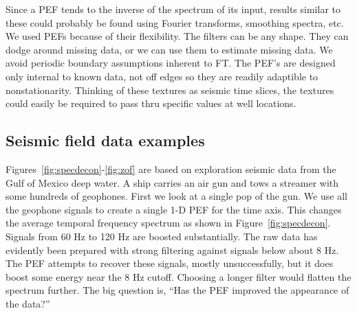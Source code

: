 



\par
Since a PEF tends to the inverse of the spectrum of its input,
results similar to these could probably be found
using Fourier transforms, smoothing spectra, etc.
We used PEFs because of their flexibility.
The filters can be any shape.
They can dodge around missing data, or we can use them
to estimate missing data.
We avoid periodic boundary assumptions inherent to FT.
The PEF's are designed only internal to known data, not off edges
so they are readily adaptible to nonstationarity.
Thinking of these textures as seismic time slices,
the textures could easily be required to pass thru specific
values at well locations.  



\subsection{Seismic field data examples}
\par
Figures~\ref{fig:specdecon}-\ref{fig:zof}
are based on exploration seismic data from the Gulf of Mexico deep water.
A ship carries an air gun and tows a streamer with some hundreds of geophones.
First we look at a single pop of the gun.
We use all the geophone signals to create a single 1-D PEF for the time axis.
This changes the average temporal frequency spectrum
as shown in Figure~\ref{fig:specdecon}.
Signals from 60 Hz to 120 Hz are boosted substantially.
The raw data has evidently been prepared
with strong filtering against signals below about 8 Hz.
The PEF attempts to recover these signals, mostly unsuccessfully,
but it does boost some energy near the 8 Hz cutoff.
Choosing a longer filter would flatten the spectrum further.
The big question is, ``Has the PEF improved the appearance of the data?''


